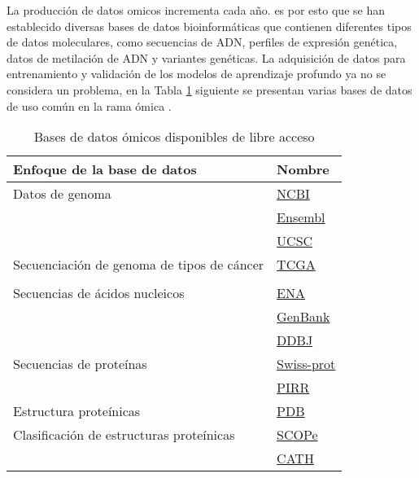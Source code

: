 La producción de datos omicos incrementa cada año. es por esto que se han establecido diversas bases de datos bioinformáticas que contienen diferentes tipos de datos moleculares, como secuencias de ADN, perfiles de expresión genética, datos de metilación de ADN y variantes genéticas. La adquisición de datos para entrenamiento y validación de los modelos de aprendizaje profundo ya no se considera un problema, en la Tabla \ref{tab:bases_de_datos} siguiente se presentan varias bases de datos de uso común en la rama ómica \citep{zhang2019deep}. \\

\begin{table}[h!]
    \scriptsize
    \centering
    \caption{Bases de datos ómicos disponibles de libre acceso}
    
    \begin{tabular}{
    >{\centering\arraybackslash}m{6cm} 
    >{\centering\arraybackslash}m{3cm}}
\hline 
        \textbf{Enfoque de la base de datos} & 
        \textbf{Nombre}
\\      
    \hline \hline 

     Datos de genoma &
    {\href{https://www.ncbi.nlm.nih.gov/genome}{NCBI}}
    \\
    &
     {\href{https://www.ensembl.org/index.html}{Ensembl}}
     \\
      &
      {\href{https://www.ensembl.org/index.html}{UCSC}}
     \\
\hline
      Secuenciación de genoma de tipos de cáncer &
     {\href{https://portal.gdc.cancer.gov/}{TCGA}}
    \\
    \\
\hline
      Secuencias de ácidos nucleicos
     &
     {\href{https://www.ebi.ac.uk/ena/browser/home}{ENA}}
     \\
     &
     {\href{https://www.ncbi.nlm.nih.gov/genbank/}{GenBank}} 
     \\
     &
     {\href{https://www.ddbj.nig.ac.jp/index-e.html}{DDBJ}}
     \\
\hline
     Secuencias de proteínas &
     {\href{https://www.uniprot.org/uniprotkb/P51587/entry}{Swiss-prot}}
\\ 
     &
     {\href{https://proteininformationresource.org/}{PIRR}}
     \\
\hline 
     Estructura proteínicas
     &
     {\href{https://www.rcsb.org/pdb}{PDB}}
     \\
\hline     
     Clasificación de estructuras proteínicas &
     {\href{https://scop.berkeley.edu/}{SCOPe}}
     \\
     &
{\href{http://www.cathdb.info/}{CATH}}
     \\
    \hline 
    \end{tabular}
    \label{tab:bases_de_datos}
\end{table}

